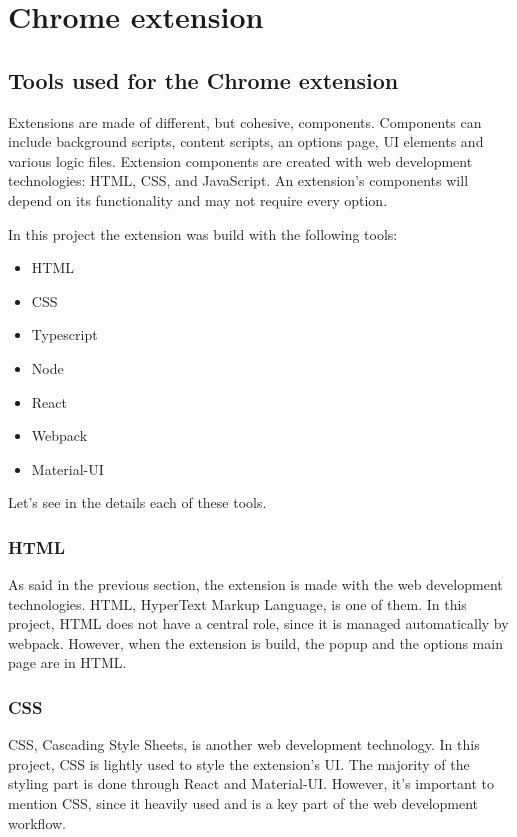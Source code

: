 \section{Chrome extension}
\subsection{Tools used for the Chrome extension}

Extensions are made of different, but cohesive, components. Components can include background scripts, content scripts, an options page, UI elements and various logic files. Extension components are created with web development technologies: HTML, CSS, and JavaScript. An extension's components will depend on its functionality and may not require every option.

In this project the extension was build with the following tools:

\begin{itemize}
    \item HTML
    \item CSS
    \item Typescript
    \item Node
    \item React
    \item Webpack
    \item Material-UI
\end{itemize}

Let's see in the details each of these tools.

\subsubsection {HTML}

As said in the previous section, the extension is made with the web development technologies. HTML, HyperText Markup Language, is one of them.
In this project, HTML does not have a central role, since it is managed automatically by webpack. However, when the extension is build, the popup and the options main page are in HTML.

\subsubsection {CSS}

CSS, Cascading Style Sheets, is another web development technology. In this project, CSS is lightly used to style the extension's UI. The majority of the styling part is done through React and Material-UI. However, it's important to mention CSS, since it heavily used and is a key part of the web development workflow.

